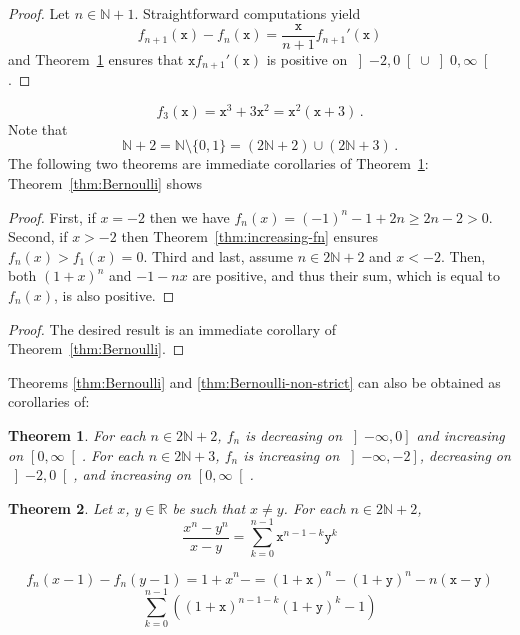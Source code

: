 \documentclass[12pt]{article}
\newcommand{\bR}{\mathbb{R}}
\newcommand{\bN}{\mathbb{N}}
\newcommand{\gtint}[1]{\left] #1, \infty \right[}
\newcommand{\geint}[1]{\left[ #1, \infty \right[}
\newcommand{\leint}[1]{\left]- \infty, #1 \right]}
\newcommand{\ttx}{\mathtt{x}}
\newcommand{\tty}{\mathtt{y}}
\newtheorem{theorem}{Theorem}
\begin{document}
\begin{proof}
  Let $n \in \bN + 1$.
 Straightforward computations yield  
 $$
 f_{n+ 1} (\ttx) - f_n(\ttx) = \frac{\ttx}{n + 1}  f_{n + 1}'(\ttx) 
 $$
 and
 Theorem~\ref{thm:variation} ensures that $\ttx f_{n + 1}'(\ttx)$ is positive on $\left]- 2, 0 \right[ \cup \gtint{0}$.
\end{proof} 

 \begin{equation} \label{eq:f3-t3}
f_3(\ttx) = \ttx^3 + 3 \ttx^2 = \ttx^2 (\ttx + 3) \,.
\end{equation}
Note that
$$\bN + 2 = \bN \setminus \{ 0, 1 \} = (2 \bN + 2) \cup (2 \bN + 3) \, .$$
The following two theorems are immediate corollaries of Theorem~\ref{thm:variation}:
 Theorem~\ref{thm:Bernoulli} shows  

 


 \begin{proof}
   First,
   if $x = - 2$ then 
   we have $f_n(x) = {(- 1)}^n - 1 + 2n \ge 2 n - 2 > 0$.
   Second,
   if $x > - 2$ then Theorem~\ref{thm:increasing-fn} ensures $f_n(x) > f_1(x) =  0$.
   Third and last, assume $n \in 2 \bN + 2$ and $x < - 2$.
   Then, both ${(1 + x)}^n$ and $- 1 - n x$ are positive,
   and thus their sum, which is equal to $f_n(x)$, is also positive.
 \end{proof}
 


 \begin{proof}
   The desired result is an immediate corollary of Theorem~\ref{thm:Bernoulli}.
 \end{proof}

 Theorems \ref{thm:Bernoulli} and \ref{thm:Bernoulli-non-strict} can also be obtained as corollaries of:
 
  \begin{theorem} \label{thm:variation}
    For each $n \in 2 \bN + 2$,
    $f_n$ is
    decreasing on $\leint{0}$ and
    increasing on $\geint{0}$.
   For each $n \in 2 \bN + 3$, $f_n$ is
   increasing on $\leint{- 2}$,
   decreasing on $\left]- 2, 0 \right[$, and
   increasing on $\geint{0}$.
\end{theorem}

\begin{theorem}
  Let $x$, $y \in \bR$ be such that $x \ne y$.
   For each $n \in 2 \bN + 2$, 
   $$
  \frac{x^n - y^n}{x - y} = \sum_{k = 0}^{n - 1} \ttx^{n - 1 - k}\tty^k 
   $$
   
   $$
   f_n(x - 1) - f_n(y - 1) = {1 + x}^n - 
    = 
   {(1 + \ttx)}^n - {(1 + \tty)}^n - n (\ttx - \tty)
   $$
   $$
   \sum_{k = 0}^{n - 1} \left(  {(1 + \ttx)}^{n - 1 - k}{(1 + \tty)}^k - 1  \right)
   $$
 \end{theorem}
\end{document}
